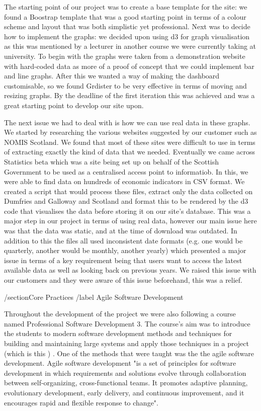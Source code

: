 \documentclass{l3proj}
\begin{document}
The starting point of our project was to create a base template for the site: we found a Boostrap template that was a good starting
point in terms of a colour scheme and layout that was both simplistic yet professional. Next was to decide how to implement the
graphs: we decided upon using d3 for graph visualisation as this was mentioned by a lecturer in another course we were currently
taking at university. To begin with the graphs were taken from a demonstration website with hard-coded data as more of a proof
of concept that we could implement bar and line graphs. After this we wanted a way of making the dashboard customisable, so we
found Grdister to be very effective in terms of moving and resizing graphs. By the deadline of the first iteration this was
achieved and was a great starting point to develop our site upon.

The next issue we had to deal with is how we can use real data in these graphs. We started by researching the various websites
suggested by our customer such as NOMIS Scotland. We found that most of these sites were difficult to use in terms of extracting
exactly the kind of data that we needed. Eventually we came across Statistics beta which was a site being set up on behalf of
the Scottish Government to be used as a centralised access point to informatiob. In this, we were able to find data on
hundreds of economic indicators in CSV format. We created a script that would process these files, extract only the data collected
on Dumfries and Galloway and Scotland and format this to be rendered by the d3 code that visualises the data before storing it on
our site's database. This was a major step in our project in terms of using real data, however our main issue here was that the
data was static, and at the time of download was outdated. In addition to this the files all used inconsistent date formats (e.g.
one would be quarterly, another would be monthly, another yearly) which presented a major issue in terms of a key requirement
being that users want to access the latest available data as well as looking back on previous years. We raised this issue
with our customers and they were aware of this issue beforehand, this was a relief.

/section{Core Practices}
/label {Agile Software Development}

Throughout the development of the project we were also following a course named Professional Software Development 3.
The course's aim was to introduce the students to modern software development methods and techniques for building and
maintaining large systems and apply those techniques in a project (which is this ) . One of the methods that were taught
was the the agile software development. Agile software development "is a set of principles for software development in
which requirements and solutions evolve through collaboration between self-organizing, cross-functional teams.
It promotes adaptive planning, evolutionary development, early delivery, and continuous improvement, and it encourages
rapid and flexible response to change".
\end{document}
